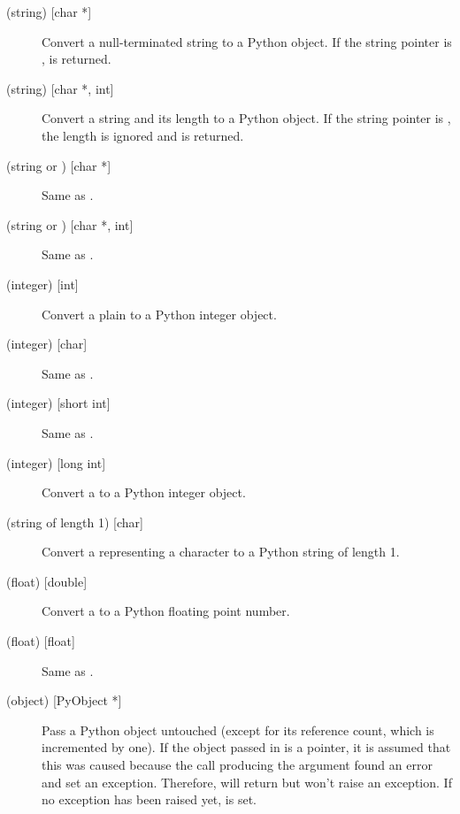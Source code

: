 \documentclass[twoside,openright]{report}
\begin{document}
\begin{description}

\item[ (string) {[char *]}]
Convert a null-terminated \C{} string to a Python object.  If the \C{}
string pointer is \NULL{},  is returned.

\item[ (string) {[char *, int]}]
Convert a \C{} string and its length to a Python object.  If the \C{} string
pointer is \NULL{}, the length is ignored and  is
returned.

\item[ (string or ) {[char *]}]
Same as .

\item[ (string or ) {[char *, int]}]
Same as .

\item[ (integer) {[int]}]
Convert a plain \C{}  to a Python integer object.

\item[ (integer) {[char]}]
Same as .

\item[ (integer) {[short int]}]
Same as .

\item[ (integer) {[long int]}]
Convert a \C{}  to a Python integer object.

\item[ (string of length 1) {[char]}]
Convert a \C{}  representing a character to a Python string of
length 1.

\item[ (float) {[double]}]
Convert a \C{}  to a Python floating point number.

\item[ (float) {[float]}]
Same as .

\item[ (object) {[PyObject *]}]
Pass a Python object untouched (except for its reference count, which
is incremented by one).  If the object passed in is a \NULL{}
pointer, it is assumed that this was caused because the call producing
the argument found an error and set an exception.  Therefore,
 will return \NULL{} but won't raise an
exception.  If no exception has been raised yet,
 is set.


\end{description}
\end{document}
